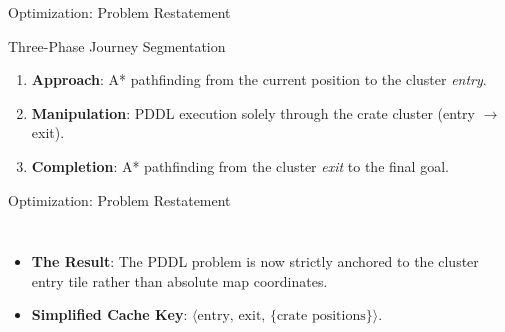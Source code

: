 \begin{frame}{Optimization: Problem Restatement}
  \begin{block}{Three-Phase Journey Segmentation}
    \begin{enumerate}
      \item \textbf{Approach}: A* pathfinding from the current position to the cluster \emph{entry}.
      \item \textbf{Manipulation}: PDDL execution solely through the crate cluster (entry $\to$ exit).
      \item \textbf{Completion}: A* pathfinding from the cluster \emph{exit} to the final goal.
    \end{enumerate}
  \end{block}
\end{frame}

\begin{frame}{Optimization: Problem Restatement}
  \begin{columns}
      \begin{itemize}
        \item \textbf{The Result}: The PDDL problem is now strictly anchored to the cluster entry tile rather than absolute map coordinates.
        \item \textbf{Simplified Cache Key}: $\langle \text{entry},\, \text{exit},\, \{\text{crate positions}\} \rangle$.
      \end{itemize}
        \centering
        \resizebox{\linewidth}{!}{}
  \end{columns}
\end{frame}

